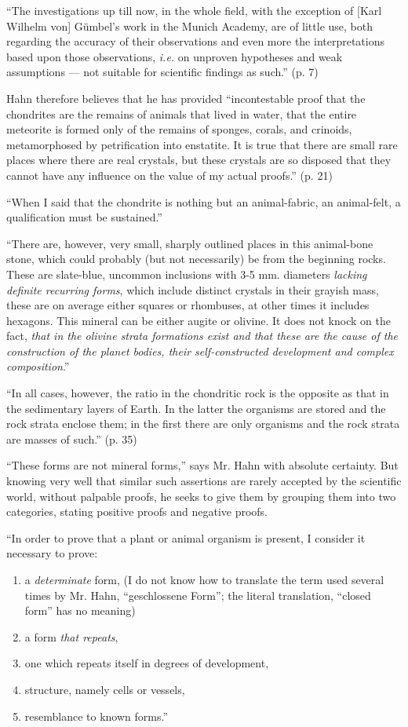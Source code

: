 \documentclass[a4paper, 12pt, oneside]{article}
\begin{document}
``The investigations up till now, in the whole field, with the exception of [Karl Wilhelm von] Gümbel's work in the Munich Academy, are of little use, both regarding the accuracy of their observations and even more the interpretations based upon those observations, \emph{i.e.} on unproven hypotheses and weak assumptions --- not suitable for scientific findings as such.'' (p. 7)

Hahn therefore believes that he has provided ``incontestable proof that the chondrites are the remains of animals that lived in water, that the entire meteorite is formed only of the remains of sponges, corals, and crinoids, metamorphosed by petrification into enstatite. It is true that there are small rare places where there are real crystals, but these crystals are so disposed that they cannot have any influence on the value of my actual proofs.'' (p. 21)

``When I said that the chondrite is nothing but an animal-fabric, an animal-felt, a qualification must be sustained.''

``There are, however, very small, sharply outlined places in this animal-bone stone, which could probably (but not necessarily) be from the beginning rocks. These are slate-blue, uncommon inclusions with 3-5 mm. diameters \emph{lacking definite recurring forms}, which include distinct crystals in their grayish mass, these are on average either squares or rhombuses, at other times it includes hexagons. This mineral can be either augite or olivine. It does not knock on the fact, \emph{that in the olivine strata formations exist and that these are the cause of the construction of the planet bodies, their self-constructed development and complex composition}.''

``In all cases, however, the ratio in the chondritic rock is the opposite as that in the sedimentary layers of Earth. In the latter the organisms are stored and the rock strata enclose them; in the first there are only organisms and the rock strata are masses of such.'' (p. 35)

``These forms are not mineral forms,'' says Mr. Hahn with absolute certainty. But knowing very well that similar such assertions are rarely accepted by the scientific world, without palpable proofs, he seeks to give them by grouping them into two categories, stating positive proofs and negative proofs.

``In order to prove that a plant or animal organism is present, I consider it necessary to prove:
\begin{enumerate}
\item a \emph{determinate} form, (I do not know how to translate the term used several times by Mr. Hahn, ``geschlossene Form''; the literal translation, ``closed form'' has no meaning)
\item a form \emph{that repeats},
\item one which repeats itself in degrees of development,
\item structure, namely cells or vessels,
\item resemblance to known forms.''
\end{enumerate}
\end{document}
